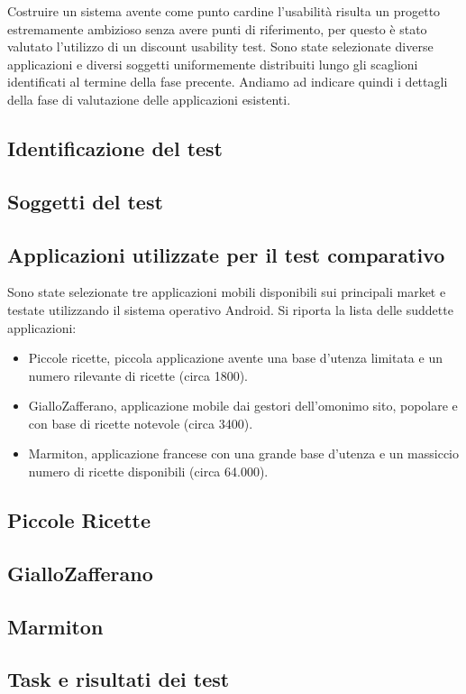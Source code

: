 Costruire un sistema avente come punto cardine l'usabilità risulta un progetto
estremamente ambizioso senza avere punti di riferimento, per questo è stato
valutato l'utilizzo di un discount usability test.  Sono state selezionate
diverse applicazioni e diversi soggetti uniformemente distribuiti lungo gli
scaglioni identificati al termine della fase precente.  Andiamo ad indicare
quindi i dettagli della fase di valutazione delle applicazioni esistenti.

\subsection{Identificazione del test}
\subsection{Soggetti del test}

\subsection{Applicazioni utilizzate per il test comparativo}
Sono state selezionate tre applicazioni mobili disponibili sui principali market
e testate utilizzando il sistema operativo Android.  Si riporta la lista delle
suddette applicazioni:
\begin{itemize}
	\item Piccole ricette, piccola applicazione avente una base d'utenza
	limitata e un numero rilevante di ricette (circa 1800).
	\item GialloZafferano, applicazione mobile dai gestori dell'omonimo
	sito, popolare e con base di ricette notevole (circa 3400).
	\item Marmiton, applicazione francese con una grande base d'utenza e
	un massiccio numero di ricette disponibili (circa 64.000).
\end{itemize}

\subsection{Piccole Ricette}
\subsection{GialloZafferano}
\subsection{Marmiton}

\subsection{Task e risultati dei test}
